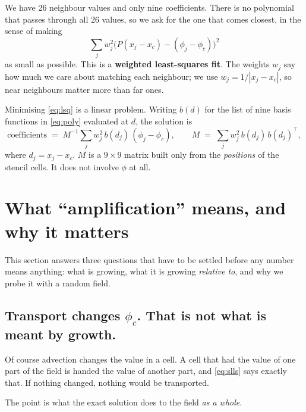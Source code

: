 \documentclass[11pt,a4paper]{article}
\begin{document}
We have 26 neighbour values and only nine coefficients. There is no polynomial that passes
through all 26 values, so we ask for the one that comes closest, in the sense of making
\begin{equation}
  \sum_{j} w_j^2 \bigl( P(x_j - x_c) - (\phi_j - \phi_c) \bigr)^2
  \label{eq:lsq}
\end{equation}
as small as possible. This is a \textbf{weighted least-squares fit}. The weights \(w_j\) say
how much we care about matching each neighbour; we use \(w_j = 1/|x_j - x_c|\), so near
neighbours matter more than far ones.

Minimising \eqref{eq:lsq} is a linear problem. Writing \(b(d)\) for the list of nine basis
functions in \eqref{eq:poly} evaluated at \(d\), the solution is
\begin{equation}
  \text{coefficients} \;=\; M^{-1} \sum_j w_j^2\, b(d_j)\,(\phi_j - \phi_c),
  \qquad
  M \;=\; \sum_j w_j^2\, b(d_j)\, b(d_j)^{\!\top},
  \label{eq:normal}
\end{equation}
where \(d_j = x_j - x_c\). \(M\) is a \(9\times 9\) matrix built only from the \emph{positions}
of the stencil cells. It does not involve \(\phi\) at all.

\section{What ``amplification'' means, and why it matters}
\label{sec:whatgrows}

This section answers three questions that have to be settled before any number means anything:
what is growing, what it is growing \emph{relative to}, and why we probe it with a random
field.

\subsection{Transport changes \texorpdfstring{$\phi_c$}{phi\_c}. That is not what is meant by growth.}

Of course advection changes the value in a cell. A cell that had the value of one part of the
field is handed the value of another part, and \eqref{eq:slls} says exactly that. If nothing
changed, nothing would be transported.

The point is what the exact solution does to the field \emph{as a whole}.

\begin{center}
\end{center}
\end{document}
